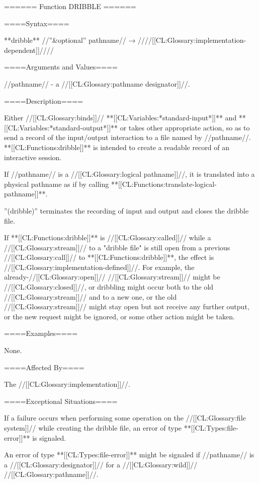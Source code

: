 ====== Function DRIBBLE ======

====Syntax====

**dribble** //''&optional'' pathname// → ////[[CL:Glossary:implementation-dependent]]////

====Arguments and Values====

//pathname// - a //[[CL:Glossary:pathname designator]]//.

====Description====

Either //[[CL:Glossary:binds]]// **[[CL:Variables:*standard-input*]]** and **[[CL:Variables:*standard-output*]]** or takes other appropriate action, so as to send a record of the input/output interaction to a file named by //pathname//. **[[CL:Functions:dribble]]** is intended to create a readable record of an interactive session.

If //pathname// is a //[[CL:Glossary:logical pathname]]//, it is translated into a physical pathname as if by calling **[[CL:Functions:translate-logical-pathname]]**.

''(dribble)'' terminates the recording of input and output and closes the dribble file.

If **[[CL:Functions:dribble]]** is //[[CL:Glossary:called]]// while a //[[CL:Glossary:stream]]// to a "dribble file" is still open from a previous //[[CL:Glossary:call]]// to **[[CL:Functions:dribble]]**, the effect is //[[CL:Glossary:implementation-defined]]//. For example, the already-//[[CL:Glossary:open]]// //[[CL:Glossary:stream]]// might be //[[CL:Glossary:closed]]//, or dribbling might occur both to the old //[[CL:Glossary:stream]]// and to a new one, or the old //[[CL:Glossary:stream]]// might stay open but not receive any further output, or the new request might be ignored, or some other action might be taken.

====Examples====

None.

====Affected By====

The //[[CL:Glossary:implementation]]//.

====Exceptional Situations====

If a failure occurs when performing some operation on the //[[CL:Glossary:file system]]// while creating the dribble file, an error of type **[[CL:Types:file-error]]** is signaled.

An error of type **[[CL:Types:file-error]]** might be signaled if //pathname// is a //[[CL:Glossary:designator]]// for a //[[CL:Glossary:wild]]// //[[CL:Glossary:pathname]]//.

